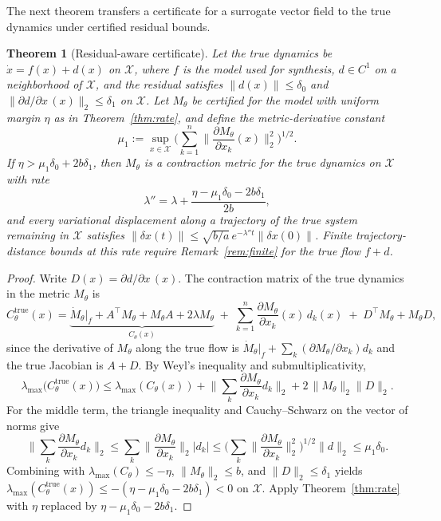 \documentclass[12pt,onecolumn,journal]{IEEEtran}
\newtheorem{theorem}{Theorem}
\newcommand{\X}{\mathcal{X}}
\newcommand{\lmax}{\lambda_{\max}}
\begin{document}
The next theorem transfers a certificate for a surrogate vector field to the true dynamics under certified residual bounds.

\begin{theorem}[Residual-aware certificate]
\label{thm:residual}
Let the true dynamics be $\dot x = f(x) + d(x)$ on $\X$, where $f$ is the model used for synthesis, $d\in C^1$ on a neighborhood of $\X$, and the residual satisfies $\|d(x)\| \le \delta_0$ and $\|\partial d/\partial x\,(x)\|_2 \le \delta_1$ on $\X$. Let $M_\theta$ be certified for the model with uniform margin $\eta$ as in Theorem~\ref{thm:rate}, and define the metric-derivative constant
\[
\mu_1 := \sup_{x \in \X} \Big( \textstyle\sum_{k=1}^{n} \big\| \frac{\partial M_\theta}{\partial x_k}(x) \big\|_2^2 \Big)^{1/2}.
\]
If $\eta > \mu_1 \delta_0 + 2 b \delta_1$, then $M_\theta$ is a contraction metric for the true dynamics on $\X$ with rate
\[
\lambda'' = \lambda + \frac{\eta - \mu_1 \delta_0 - 2 b \delta_1}{2b},
\]
and every variational displacement along a trajectory of the true system remaining in $\X$ satisfies $\|\delta x(t)\| \le \sqrt{b/a}\, e^{-\lambda'' t} \|\delta x(0)\|$. Finite trajectory-distance bounds at this rate require Remark~\ref{rem:finite} for the true flow $f+d$.
\end{theorem}

\begin{proof}
Write $D(x) = \partial d/\partial x\,(x)$. The contraction matrix of the true dynamics in the metric $M_\theta$ is
\[
C^{\mathrm{true}}_\theta(x)
= \underbrace{\dot M_\theta\big|_f + A^\top M_\theta + M_\theta A + 2\lambda M_\theta}_{C_\theta(x)}
\;+\; \sum_{k=1}^{n} \frac{\partial M_\theta}{\partial x_k}(x)\, d_k(x)
\;+\; D^\top M_\theta + M_\theta D,
\]
since the derivative of $M_\theta$ along the true flow is $\dot M_\theta\big|_f + \sum_k (\partial M_\theta/\partial x_k) d_k$ and the true Jacobian is $A + D$. By Weyl's inequality and submultiplicativity,
\[
\lmax\!\big(C^{\mathrm{true}}_\theta(x)\big)
\le \lmax(C_\theta(x))
+ \Big\| \sum_k \frac{\partial M_\theta}{\partial x_k} d_k \Big\|_2
+ 2\,\|M_\theta\|_2 \|D\|_2 .
\]
For the middle term, the triangle inequality and Cauchy--Schwarz on the vector of norms give
\[
\Big\| \sum_k \frac{\partial M_\theta}{\partial x_k} d_k \Big\|_2
\le \sum_k \Big\|\frac{\partial M_\theta}{\partial x_k}\Big\|_2 |d_k|
\le \Big( \sum_k \Big\|\frac{\partial M_\theta}{\partial x_k}\Big\|_2^2 \Big)^{1/2} \|d\|_2
\le \mu_1 \delta_0 .
\]
Combining with $\lmax(C_\theta) \le -\eta$, $\|M_\theta\|_2 \le b$, and $\|D\|_2 \le \delta_1$ yields $\lmax(C^{\mathrm{true}}_\theta(x)) \le -(\eta - \mu_1\delta_0 - 2b\delta_1) < 0$ on $\X$. Apply Theorem~\ref{thm:rate} with $\eta$ replaced by $\eta - \mu_1\delta_0 - 2b\delta_1$.
\end{proof}
\end{document}
